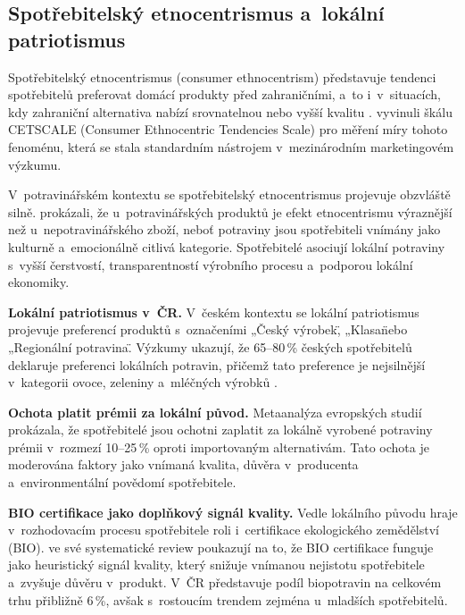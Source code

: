 \subsection{Spotřebitelský etnocentrismus a~lokální patriotismus}
\label{subsec:theory_ethnocentrism}

Spotřebitelský etnocentrismus (consumer ethnocentrism) představuje tendenci spotřebitelů preferovat domácí produkty před zahraničními, a~to i~v~situacích, kdy zahraniční alternativa nabízí srovnatelnou nebo vyšší kvalitu \parencite{shimp_sharma_1987}. \textcite{shimp_sharma_1987} vyvinuli škálu CETSCALE (Consumer Ethnocentric Tendencies Scale) pro měření míry tohoto fenoménu, která se stala standardním nástrojem v~mezinárodním marketingovém výzkumu.

V~potravinářském kontextu se spotřebitelský etnocentrismus projevuje obzvláště silně. \textcite{schnettler_2011} prokázali, že u~potravinářských produktů je efekt etnocentrismu výraznější než u~nepotravinářského zboží, neboť potraviny jsou spotřebiteli vnímány jako kulturně a~emocionálně citlivá kategorie. Spotřebitelé asociují lokální potraviny s~vyšší čerstvostí, transparentností výrobního procesu a~podporou lokální ekonomiky.

\textbf{Lokální patriotismus v~ČR.} V~českém kontextu se lokální patriotismus projevuje preferencí produktů s~označeními „Český výrobek\", „Klasa\" nebo „Regionální potravina\". Výzkumy ukazují, že 65--80\,\% českých spotřebitelů deklaruje preferenci lokálních potravin, přičemž tato preference je nejsilnější v~kategorii ovoce, zeleniny a~mléčných výrobků \parencite{Czech_Sentiment}.

\textbf{Ochota platit prémii za lokální původ.} Metaanalýza evropských studií \parencite{Feldmann_Hamm_2015} prokázala, že spotřebitelé jsou ochotni zaplatit za lokálně vyrobené potraviny prémii v~rozmezí 10--25\,\% oproti importovaným alternativám. Tato ochota je moderována faktory jako vnímaná kvalita, důvěra v~producenta a~environmentální povědomí spotřebitele.

\textbf{BIO certifikace jako doplňkový signál kvality.} Vedle lokálního původu hraje v~rozhodovacím procesu spotřebitele roli i~certifikace ekologického zemědělství (BIO). \textcite{Aschemann_2007} ve své systematické review poukazují na to, že BIO certifikace funguje jako heuristický signál kvality, který snižuje vnímanou nejistotu spotřebitele a~zvyšuje důvěru v~produkt. V~ČR představuje podíl biopotravin na celkovém trhu přibližně 6\,\%, avšak s~rostoucím trendem zejména u~mladších spotřebitelů.


